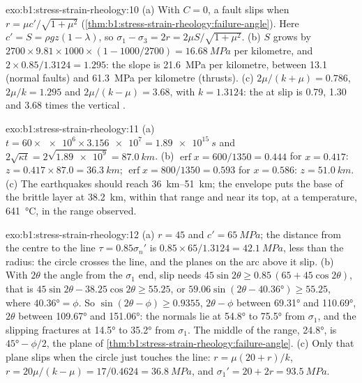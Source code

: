 \begin{solution}{exo:b1:stress-strain-rheology:10}
(a) With $C = 0$, a fault slips when $r = \mu c'/\sqrt{1+\mu^2}$
(\cref{thm:b1:stress-strain-rheology:failure-angle}). Here $c' = S =
\rho g z(1-\lambda)$, so $\sigma_1 - \sigma_3 = 2r = 2\mu S/\sqrt{1+\mu^2}$.
(b) $S$ grows by $2700\times9.81\times1000\times(1 - 1000/2700) =
\qty{16.68}{MPa}$ per kilometre, and $2\times0.85/1.3124 = 1.295$: the slope
is \qty{21.6}{MPa} per kilometre, between \num{13.1} (normal faults) and
\qty{61.3}{MPa} per kilometre (thrusts). (c) $2\mu/(k+\mu) = 0.786$,
$2\mu/k = 1.295$ and $2\mu/(k-\mu) = 3.68$, with $k = 1.3124$: the
 at slip is 0.79, 1.30 and 3.68 times the vertical
.
\end{solution}

\begin{solution}{exo:b1:stress-strain-rheology:11}
(a) $t = 60\times\num{e6}\times\num{3.156e7} = \qty{1.89e15}{s}$ and
$2\sqrt{\kappa t} = 2\sqrt{\num{1.89e9}} = \qty{87.0}{km}$. (b)
$\operatorname{erf}x = 600/1350 = 0.444$ for $x = 0.417$: $z = 0.417\times87.0
= \qty{36.3}{km}$; $\operatorname{erf}x = 800/1350 = 0.593$ for $x = 0.586$:
$z = \qty{51.0}{km}$. (c) The earthquakes should reach \qtyrange{36}{51}{km};
the envelope puts the base of the brittle layer at \qty{38.2}{km}, within
that range and near its top, at a temperature, \qty{641}{\degreeCelsius}, in
the range observed.
\end{solution}

\begin{solution}{exo:b1:stress-strain-rheology:12}
(a) $r = 45$ and $c' = \qty{65}{MPa}$; the distance from the centre to the line
$\tau = 0.85\sigma_n'$ is $0.85\times65/1.3124 = \qty{42.1}{MPa}$, less than
the radius: the circle crosses the line, and the planes on the arc above it
slip. (b) With $2\theta$ the angle from the $\sigma_1$ end, slip needs
$45\sin2\theta \ge 0.85\,(65 + 45\cos2\theta)$, that is
$45\sin2\theta - 38.25\cos2\theta \ge 55.25$, or
$59.06\sin(2\theta - \ang{40.36}) \ge 55.25$, where $\ang{40.36} = \phi$.
So $\sin(2\theta - \phi) \ge 0.9355$, $2\theta - \phi$ between \ang{69.31}
and \ang{110.69}, $2\theta$ between \ang{109.67} and \ang{151.06}: the normals
lie at \ang{54.8} to \ang{75.5} from $\sigma_1$, and the slipping fractures
at \ang{14.5} to \ang{35.2} from $\sigma_1$. The middle of the range,
\ang{24.8}, is $\ang{45} - \phi/2$, the plane of
\cref{thm:b1:stress-strain-rheology:failure-angle}. (c) Only that plane slips
when the circle just touches the line: $r = \mu(20 + r)/k$, $r = 20\mu/(k -
\mu) = 17/0.4624 = \qty{36.8}{MPa}$, and $\sigma_1' = 20 + 2r =
\qty{93.5}{MPa}$.
\end{solution}

